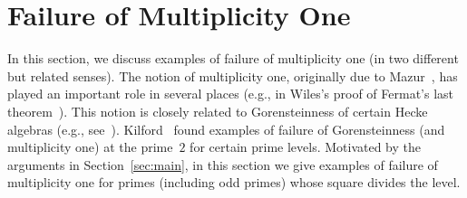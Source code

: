 \documentclass[10pt,twoside]{article}
\theoremstyle{definition}
\begin{document}
\section{Failure of Multiplicity One}\label{sec:mult1}
In this section, we discuss examples of failure of multiplicity one
(in two different but related senses). The notion of multiplicity one,
originally due to Mazur~\cite{mazur:eisenstein}, has played an
important role in several places (e.g., in Wiles's proof of Fermat's
last theorem~\cite{wiles}). This notion is closely related to
Gorensteinness of certain Hecke algebras (e.g., see~\cite{tilouine:hecke}).
Kilford~\cite{kilford} found examples of failure of Gorensteinness
(and multiplicity one) at the prime~$2$ for certain prime levels.
Motivated by the arguments in Section~\ref{sec:main}, in this section
we give examples of failure of multiplicity one for primes (including
odd primes) whose square divides the level.
\end{document}
